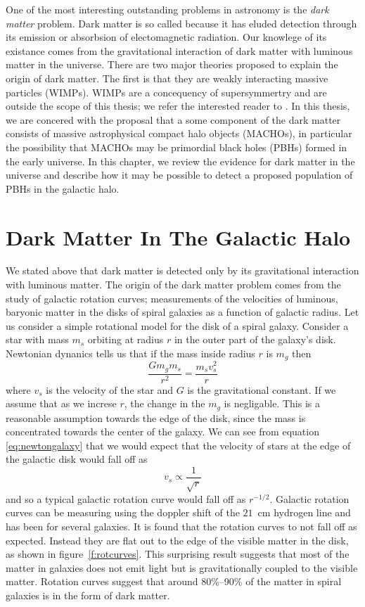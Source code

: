 
One of the most interesting outstanding problems in astronomy is the
\emph{dark matter} problem. Dark matter is so called because it has eluded
detection through its emission or absorbsion of electomagnetic radiation. Our
knowlege of its existance comes from the gravitational interaction of dark
matter with luminous matter in the universe. There are two major theories
proposed to explain the origin of dark matter. The first is that they are
weakly interacting massive particles (WIMPs). WIMPs are a concequency of
supersymmertry and are outside the scope of this thesis; we refer the
interested reader to \cite{XXX}.  In this thesis, we are concered with the
proposal that a some component of the dark matter consists of massive
astrophysical compact halo objects (MACHOs), in particular the possibility
that MACHOs may be primordial black holes (PBHs) formed in the early universe.
In this chapter, we review the evidence for dark matter in the universe and
describe how it may be possible to detect a proposed population of PBHs in the
galactic halo.

\section{Dark Matter In The Galactic Halo}

We stated above that dark matter is detected only by its gravitational
interaction with luminous matter. The origin of the dark matter problem comes
from the study of galactic rotation curves; measurements of the velocities of
luminous, baryonic matter in the disks of spiral galaxies as a function of
galactic radius.  Let us consider a simple rotational model for the disk of a
spiral galaxy.  Consider a star with mass $m_s$ orbiting at radius $r$ in the
outer part of the galaxy's disk. Newtonian dynanics tells us that if the mass
inside radius $r$ is $m_g$ then
\begin{equation}
\frac{Gm_g m_s}{r^2} = \frac{m_s v_s^2}{r}
\label{eq:newtongalaxy}
\end{equation}
where $v_s$ is the velocity of the star and $G$ is the gravitational constant. 
If we assume that as we increse $r$, the change in the $m_g$ is negligable.
This is a reasonable assumption towards the edge of the disk, since the mass
is concentrated towards the center of the galaxy.  We can see from equation
\ref{eq:newtongalaxy} that we would expect that the velocity of stars at the
edge of the galactic disk would fall off as 
\begin{equation}
v_s \propto \frac{1}{\sqrt{r}}
\end{equation}
and so a typical galactic rotation curve would fall off as $r^{-1/2}$.
Galactic rotation curves can be measuring using the doppler shift of the
$21$~cm hydrogen line and has been for several galaxies. It is found that the
rotation curves to not fall off as expected. Instead they are flat out to the
edge of the visible matter in the disk, as shown in figure~\ref{f:rotcurves}. 
This surprising result suggests that most of the matter in galaxies does not
emit light but is gravitationally coupled to the visible matter. Rotation
curves suggest that around 80\%--90\% of the matter in spiral galaxies is in
the form of dark matter.

